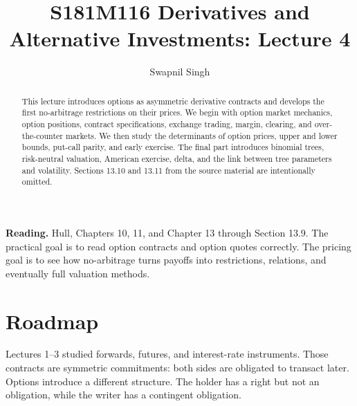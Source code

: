 

\title{S181M116 Derivatives and Alternative Investments: Lecture 4}
\author{Swapnil Singh}
\date{}


\setlength{\headheight}{26pt}

\newcommand{\St}{S_T}
\newcommand{\Szero}{S_0}
\newcommand{\K}{K}
\newcommand{\T}{T}
\newcommand{\dt}{\Delta t}
\newcommand{\erT}{e^{-rT}}
\newcommand{\erdt}{e^{-r\Delta t}}
\newcommand{\PV}{\mathrm{PV}}
\newcommand{\Prob}{\mathbb{P}}
\newcommand{\EQ}{\mathbb{E}^{Q}}
\newcommand{\pstar}{p^*}
\newcommand{\Div}{D}
\newcommand{\Ncontracts}{N}


\maketitle

\begin{abstract}
This lecture introduces options as asymmetric derivative contracts and develops
the first no-arbitrage restrictions on their prices. We begin with option market
mechanics, option positions, contract specifications, exchange trading, margin,
clearing, and over-the-counter markets. We then study the determinants of option
prices, upper and lower bounds, put-call parity, and early exercise. The final
part introduces binomial trees, risk-neutral valuation, American exercise, delta,
and the link between tree parameters and volatility. Sections 13.10 and 13.11
from the source material are intentionally omitted.
\end{abstract}

\begin{boxD}
\textbf{Reading.} Hull, Chapters 10, 11, and Chapter 13 through Section 13.9.
The practical goal is to read option contracts and option quotes correctly. The
pricing goal is to see how no-arbitrage turns payoffs into restrictions,
relations, and eventually full valuation methods.
\end{boxD}

\section{Roadmap}

Lectures 1--3 studied forwards, futures, and interest-rate instruments. Those
contracts are symmetric commitments: both sides are obligated to transact later.
Options introduce a different structure. The holder has a right but not an
obligation, while the writer has a contingent obligation.


